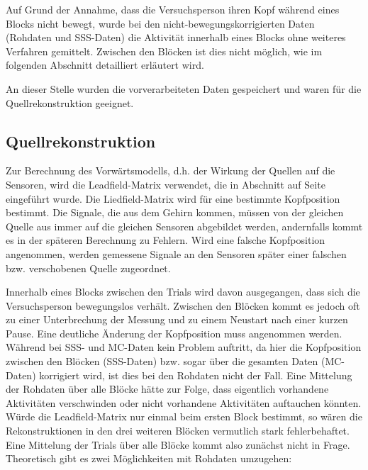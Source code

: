 \documentclass[doc,a4paper,12pt]{apa6}
\makeatletter
\DeclareRobustCommand*{\nameref}[1]{%
      \glqq{\myorg@nameref{#1}}\grqq%
    }%
\makeatother
\begin{document}
Auf Grund der Annahme, dass die Versuchsperson ihren Kopf während eines Blocks nicht bewegt, wurde bei den nicht-bewegungskorrigierten Daten (Rohdaten und SSS-Daten) die Aktivität innerhalb eines Blocks ohne weiteres Verfahren gemittelt. Zwischen den Blöcken ist dies nicht möglich, wie im folgenden Abschnitt detailliert erläutert wird.

An dieser Stelle wurden die vorverarbeiteten Daten gespeichert und waren für die Quellrekonstruktion geeignet.

\subsection{Quellrekonstruktion}
\label{sec:lead-beam-mne}

Zur Berechnung des Vorwärtsmodells, d.h. der Wirkung der Quellen auf die Sensoren, wird die Leadfield-Matrix verwendet, die in Abschnitt \nameref{sec:lead} auf Seite \pageref{sec:lead} eingeführt wurde. Die Liedfield-Matrix wird für eine bestimmte Kopfposition bestimmt. Die Signale, die aus dem Gehirn kommen, müssen von der gleichen Quelle aus immer auf die gleichen Sensoren abgebildet werden, andernfalls kommt es in der späteren Berechnung zu Fehlern. Wird eine falsche Kopfposition angenommen, werden gemessene Signale an den Sensoren später einer falschen bzw. verschobenen Quelle zugeordnet.

Innerhalb eines Blocks zwischen den Trials wird davon ausgegangen, dass sich die Versuchsperson bewegungslos verhält. Zwischen den Blöcken kommt es jedoch oft zu einer Unterbrechung der Messung und zu einem Neustart nach einer kurzen Pause. Eine deutliche Änderung der Kopfposition muss angenommen werden. Während bei SSS- und MC-Daten kein Problem auftritt, da hier die Kopfposition zwischen den Blöcken (SSS-Daten) bzw. sogar über die gesamten Daten (MC-Daten) korrigiert wird, ist dies bei den Rohdaten nicht der Fall. Eine Mittelung der Rohdaten über alle Blöcke hätte zur Folge, dass eigentlich vorhandene Aktivitäten verschwinden oder nicht vorhandene Aktivitäten auftauchen könnten. Würde die Leadfield-Matrix nur einmal beim ersten Block bestimmt, so wären die Rekonstruktionen in den drei weiteren Blöcken vermutlich stark fehlerbehaftet. Eine Mittelung der Trials über alle Blöcke kommt also zunächst nicht in Frage. Theoretisch gibt es zwei Möglichkeiten mit Rohdaten umzugehen:
\end{document}
